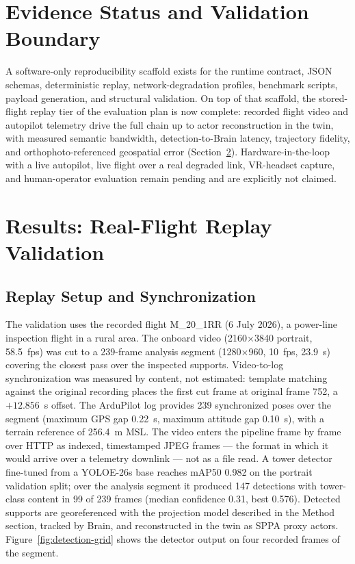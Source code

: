 \documentclass[fleqn]{VRIH2025}
\begin{document}
\section{Evidence Status and Validation Boundary}

A software-only reproducibility scaffold exists for the runtime contract, JSON schemas, deterministic replay, network-degradation profiles, benchmark scripts, payload generation, and structural validation. On top of that scaffold, the stored-flight replay tier of the evaluation plan is now complete: recorded flight video and autopilot telemetry drive the full chain up to actor reconstruction in the twin, with measured semantic bandwidth, detection-to-Brain latency, trajectory fidelity, and orthophoto-referenced geospatial error (Section~\ref{sec:results}). Hardware-in-the-loop with a live autopilot, live flight over a real degraded link, VR-headset capture, and human-operator evaluation remain pending and are explicitly not claimed.

\section{Results: Real-Flight Replay Validation}
\label{sec:results}

\subsection{Replay Setup and Synchronization}
The validation uses the recorded flight M\_20\_1RR (6 July 2026), a power-line inspection flight in a rural area. The onboard video (2160$\times$3840 portrait, 58.5~fps) was cut to a 239-frame analysis segment (1280$\times$960, 10~fps, 23.9~s) covering the closest pass over the inspected supports. Video-to-log synchronization was measured by content, not estimated: template matching against the original recording places the first cut frame at original frame 752, a $+12.856$~s offset. The ArduPilot log provides 239 synchronized poses over the segment (maximum GPS gap 0.22~s, maximum attitude gap 0.10~s), with a terrain reference of 256.4~m MSL. The video enters the pipeline frame by frame over HTTP as indexed, timestamped JPEG frames --- the format in which it would arrive over a telemetry downlink --- not as a file read. A tower detector fine-tuned from a YOLOE-26s base reaches mAP50 0.982 on the portrait validation split; over the analysis segment it produced 147 detections with tower-class content in 99 of 239 frames (median confidence 0.31, best 0.576). Detected supports are georeferenced with the projection model described in the Method section, tracked by Brain, and reconstructed in the twin as SPPA proxy actors. Figure~\ref{fig:detection-grid} shows the detector output on four recorded frames of the segment.
\end{document}
